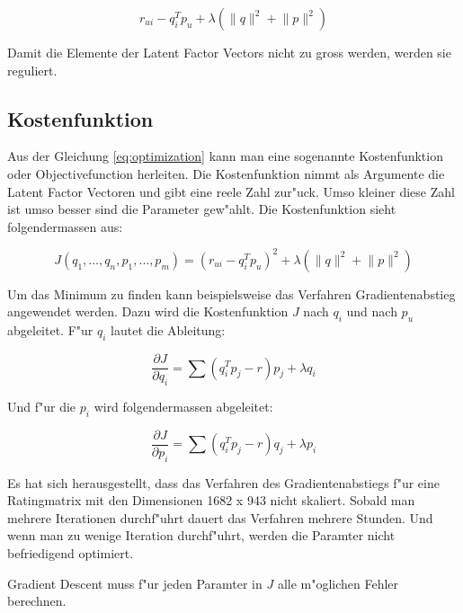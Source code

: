 \documentclass[a4paper, 12pt]{article}
\begin{document}
\begin{equation}
  \label{eq:optimization}
    r_{ui} - q_i^T p_u + \lambda (\lVert q \rVert^2 + \lVert p \lVert ^2)
\end{equation}

Damit die Elemente der Latent Factor Vectors nicht zu gross werden, werden sie reguliert.

\subsection{Kostenfunktion}
\label{sec:opt}

Aus der Gleichung \ref{eq:optimization} kann man eine sogenannte Kostenfunktion oder Objectivefunction herleiten. Die Kostenfunktion nimmt als Argumente die Latent Factor Vectoren und gibt eine reele Zahl zur"uck. Umso kleiner diese Zahl ist umso besser sind die Parameter gew"ahlt. Die Kostenfunktion sieht folgendermassen aus:

\begin{equation}
  \label{eq:costfunction}
  J(q_1, \dots , q_n, p_1, \dots, p_m) =  (r_{ui} - q_i^T p_u)^2 + \lambda (\lVert q \rVert^2 + \lVert p \lVert ^2)
\end{equation}
 
Um das Minimum zu finden kann beispielsweise das Verfahren Gradientenabstieg angewendet werden. Dazu wird die Kostenfunktion $J$ nach $q_i$ und nach $p_u$ abgeleitet. F"ur $q_i$ lautet die Ableitung:

\begin{equation}
  \label{eq:decx}
  \frac{ \partial J }{ \partial q_i } = \sum (q_i^T p_j - r) p_j + \lambda q_i
\end{equation}

Und f"ur die $p_i$ wird folgendermassen abgeleitet:

\begin{equation}
  \label{eq:dectheta}
  \frac{ \partial J }{ \partial p_i } = \sum (q_i^T p_j - r) q_j + \lambda p_i
\end{equation}

Es hat sich herausgestellt, dass das Verfahren des Gradientenabstiegs f"ur eine Ratingmatrix mit den Dimensionen 1682 x 943 nicht skaliert. Sobald man mehrere Iterationen durchf"uhrt dauert das Verfahren mehrere Stunden. Und wenn man zu wenige Iteration durchf"uhrt, werden die Paramter nicht befriedigend optimiert.

Gradient Descent muss f"ur jeden Paramter in $J$ alle m"oglichen Fehler berechnen.
\end{document}
